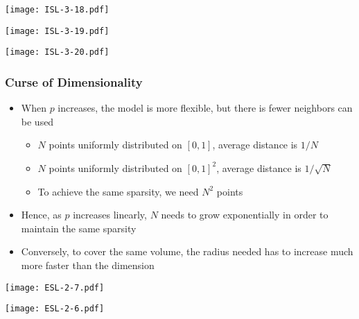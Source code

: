 \documentclass[12pt, xcolor = dvipsnames]{beamer}
\begin{document}
\begin{frame}
\begin{center}
  \texttt{[image: ISL-3-18.pdf]}
\end{center}
\end{frame}


\begin{frame}
\begin{center}
  \texttt{[image: ISL-3-19.pdf]}
\end{center}
\end{frame}


\begin{frame}
\begin{center}
  \texttt{[image: ISL-3-20.pdf]}
\end{center}
\end{frame}


\begin{frame}
\frametitle{Curse of Dimensionality}
\begin{itemize}
  \item When $p$ increases, the model is more flexible, but there is fewer neighbors can be used
  \begin{itemize}
  \item $N$ points uniformly distributed on $[0,1]$, average distance is $1/N$
  \item $N$ points uniformly distributed on $[0,1]^2$, average distance is $1/\sqrt{N}$
  \item To achieve the same sparsity, we need $N^2$ points
  \end{itemize}
  \item Hence, as $p$ increases linearly, $N$ needs to grow exponentially in order to maintain the same sparsity
  \item Conversely, to cover the same volume, the radius needed has to increase much more faster than the dimension
\end{itemize}
\end{frame}


\begin{frame}
\begin{center}
  \texttt{[image: ESL-2-7.pdf]}
\end{center}
\end{frame}


\begin{frame}
\begin{center}
  \texttt{[image: ESL-2-6.pdf]}
\end{center}
\end{frame}
\end{document}
